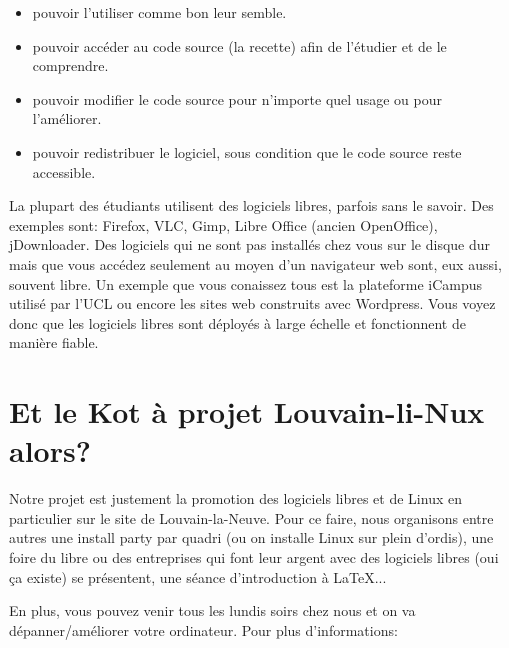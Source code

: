 \begin{itemize}
\item pouvoir l’utiliser comme bon leur semble.
\item pouvoir accéder au code source (la recette) afin de l’étudier et de le comprendre.
\item pouvoir modifier le code source pour n’importe quel usage ou pour l’améliorer.
\item pouvoir redistribuer le logiciel, sous condition que le code source reste accessible.
\end{itemize}

La plupart des étudiants utilisent des logiciels libres, parfois sans le savoir.
Des exemples sont: Firefox, VLC, Gimp, Libre Office (ancien OpenOffice), jDownloader.
Des logiciels qui ne sont pas installés chez vous sur le disque dur mais
que vous accédez seulement au moyen d'un navigateur web sont, eux aussi, souvent libre.
Un exemple que vous conaissez tous est la plateforme iCampus utilisé par l'UCL
ou encore les sites web construits avec Wordpress. Vous voyez donc que les logiciels 
libres sont déployés à large échelle et fonctionnent de manière fiable.

\section*{Et le Kot à projet Louvain-li-Nux alors?}
Notre projet est justement la promotion des logiciels libres et de Linux en particulier sur le site de Louvain-la-Neuve.
Pour ce faire, nous organisons entre autres une install party par quadri (ou on installe Linux sur plein d'ordis),
une foire du libre ou des entreprises qui font leur argent avec des logiciels libres (oui ça existe) se présentent,
une séance d'introduction à \LaTeX{}...

En plus, vous pouvez venir tous les lundis soirs chez nous et on va dépanner/améliorer votre ordinateur.
Pour plus d'informations:
                                                                                                                       

